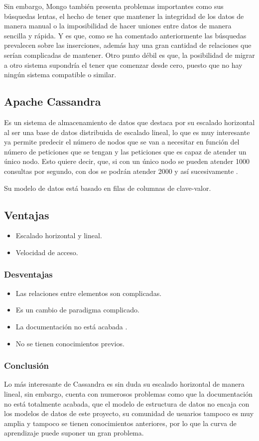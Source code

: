 Sin embargo, Mongo también presenta problemas importantes como sus búsquedas lentas, el hecho de tener que mantener la integridad de los datos de manera manual o la imposibilidad de hacer uniones entre datos de manera sencilla y rápida. Y es que, como se ha comentado anteriormente las búsquedas prevalecen sobre las inserciones, además hay una gran cantidad de relaciones que serían complicadas de mantener.
Otro punto débil es que, la posibilidad de migrar a otro sistema supondría el tener que comenzar desde cero, puesto que no hay ningún sistema compatible o similar. 

\subsection{Apache Cassandra}
Es un sistema de almacenamiento de datos que destaca por su escalado horizontal al ser una base de datos distribuida de escalado lineal, lo que es muy interesante ya permite predecir el número de nodos que se van a necesitar en función del número de peticiones que se tengan y las peticiones que es capaz de atender un único nodo. Esto quiere decir, que, si con un único nodo se pueden atender 1000 consultas por segundo, con dos se podrán atender 2000 y así sucesivamente \cite{Apache_Cassandra}. 

Su modelo de datos está basado en filas de columnas de clave-valor. 
\subsection{Ventajas}
\begin{itemize}
    \item Escalado horizontal y lineal.
    \item Velocidad de acceso.
\end{itemize}
\subsubsection{Desventajas}
\begin{itemize}
    \item Las relaciones entre elementos son complicadas.
    \item Es un cambio de paradigma complicado.
    \item La documentación no está acabada \cite{Apache_Cassandra_docu}.
    \item No se tienen conocimientos previos.
\end{itemize}
\subsubsection{Conclusión}
Lo más interesante de Cassandra es sin duda su escalado horizontal de manera lineal, sin embargo, cuenta con numerosos problemas como que la documentación no está totalmente acabada, que el modelo de estructura de datos no encaja con los modelos de datos de este proyecto, su comunidad de usuarios tampoco es muy amplia y tampoco se tienen conocimientos anteriores, por lo que la curva de aprendizaje puede suponer un gran problema. 

